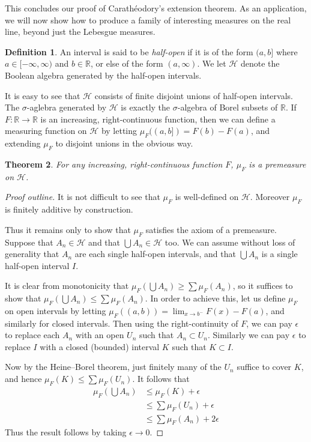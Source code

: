 \documentclass[11pt,oneside]{amsbook}
\newcommand{\RR}{{\mathbb R}}
\theoremstyle{definition}
\theoremstyle{plain}
\newtheorem{thm}{Theorem}[section]
\theoremstyle{definition}
\newtheorem{defn}[thm]{Definition}
\theoremstyle{remark}
\numberwithin{equation}{section}
\numberwithin{figure}{section}
\begin{document}
This concludes our proof of Carath\'eodory's extension theorem. As an application, we will now show how to produce a family of interesting measures on the real line, beyond just the Lebesgue measures.

\begin{defn}
  An interval is said to be \emph{half-open} if it is of the form $(a,b]$ where $a\in[-\infty,\infty)$ and $b\in\RR$, or else of the form $(a,\infty)$. We let $\mathcal H$ denote the Boolean algebra generated by the half-open intervals.
\end{defn}

It is easy to see that $\mathcal H$ consists of finite disjoint unions of half-open intervals. The $\sigma$-aglebra generated by $\mathcal H$ is exactly the $\sigma$-algebra of Borel subsets of $\RR$. If $F\colon\RR\to\RR$ is an increasing, right-continuous function, then we can define a measuring function on $\mathcal H$ by letting $\mu_F((a,b])=F(b)-F(a)$, and extending $\mu_F$ to disjoint unions in the obvious way.

\begin{thm}
  For any increasing, right-continuous function $F$, $\mu_F$ is a premeasure on $\mathcal H$.
\end{thm}

\begin{proof}[Proof outline]
  It is not difficult to see that $\mu_F$ is well-defined on $\mathcal H$. Moreover $\mu_F$ is finitely additive by construction.

  Thus it remains only to show that $\mu_F$ satisfies the axiom of a premeasure. Suppose that $A_n\in\mathcal H$ and that $\bigcup A_n\in\mathcal H$ too. We can assume without loss of generality that $A_n$ are each single half-open intervals, and that $\bigcup A_n$ is a single half-open interval $I$.

  It is clear from monotonicity that $\mu_F(\bigcup A_n)\geq\sum\mu_F(A_n)$, so it suffices to show that $\mu_F(\bigcup A_n)\leq\sum\mu_F(A_n)$. In order to achieve this, let us define $\mu_F$ on open intervals by letting $\mu_F((a,b))=\lim_{x\to b^-}F(x)-F(a)$, and similarly for closed intervals. Then using the right-continuity of $F$, we can pay $\epsilon$ to replace each $A_n$ with an open $U_n$ such that $A_n\subset U_n$. Similarly we can pay $\epsilon$ to replace $I$ with a closed (bounded) interval $K$ such that $K\subset I$.

  Now by the Heine--Borel theorem, just finitely many of the $U_n$ suffice to cover $K$, and hence $\mu_F(K)\leq\sum\mu_F(U_n)$. It follows that
  \begin{align*}
    \mu_F(\bigcup A_n)
    &\leq\mu_F(K)+\epsilon\\
    &\leq\sum\mu_F(U_n)+\epsilon\\
    &\leq\sum\mu_F(A_n)+2\epsilon
  \end{align*}
  Thus the result follows by taking $\epsilon\to0$.
\end{proof}
\end{document}
